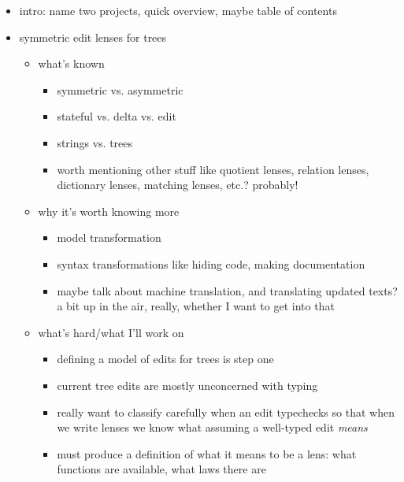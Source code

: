 \documentclass{article}
\begin{document}
\begin{itemize}
    \item intro: name two projects, quick overview, maybe table of contents
    \item symmetric edit lenses for trees
        \begin{itemize}
            \item what's known
                \begin{itemize}
                    \item symmetric vs. asymmetric
                    \item stateful vs. delta vs. edit
                    \item strings vs. trees
                    \item worth mentioning other stuff like quotient lenses,
                        relation lenses, dictionary lenses, matching lenses,
                        etc.? probably!
                \end{itemize}
            \item why it's worth knowing more
                \begin{itemize}
                    \item model transformation
                    \item syntax transformations like hiding code, making
                        documentation
                    \item maybe talk about machine translation, and
                        translating updated texts? a bit up in the air,
                        really, whether I want to get into that
                \end{itemize}
            \item what's hard/what I'll work on
                \begin{itemize}
                    \item defining a model of edits for trees is step one
                    \item current tree edits are mostly unconcerned with typing
                    \item really want to classify carefully when an edit
                        typechecks so that when we write lenses we know what
                        assuming a well-typed edit \emph{means}
                    \item must produce a definition of what it means to be a
                        lens: what functions are available, what laws there
                        are

\end{itemize}
\end{itemize}
\end{itemize}
\end{document}
